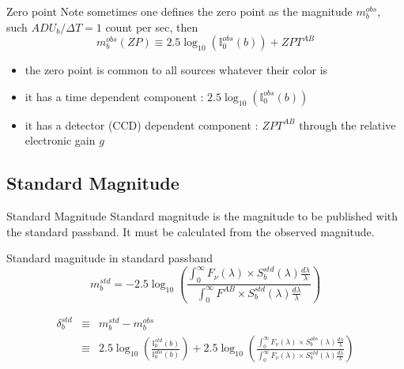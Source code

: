 \documentclass{beamer}
\begin{document}
\begin{frame}{Zero point} 
Note sometimes one defines the zero point as the magnitude $m_b^{obs}$, such $ADU_b/\Delta T = 1$ count per sec, then
\begin{equation}
m^{obs}_b(ZP) \equiv 2.5\log_{10}\left( \mathbb{I}_0^{obs}(b)\right) + ZPT^{AB}
\end{equation}	
\begin{itemize}
\item the zero point is common to all sources whatever their color is 
\item it has a time  dependent component : $2.5\log_{10}\left( \mathbb{I}_0^{obs}(b)\right)$
\item it has a detector (CCD) dependent component :  $ZPT^{AB}$ through the relative electronic gain $g$
\end{itemize}
\end{frame}



\subsection{Standard Magnitude}
\begin{frame}{Standard Magnitude} 
Standard magnitude is the magnitude to be published with the standard passband. 
It must be calculated from the observed magnitude.
\begin{alertblock}{Standard magnitude in standard passband}
	\begin{equation}
	m^{std}_b = -2.5 \log_{10}
	\left( 
	\frac{\int_0^\infty F_\nu(\lambda) \times S_b^{std}(\lambda) \frac{d\lambda}{\lambda} }{\int_0^\infty F^{AB} \times S_b^{std}(\lambda) \frac{d\lambda}{\lambda}} 
	\right)
	\end{equation}	
\end{alertblock}	

\begin{eqnarray}
\delta^{std}_b & \equiv & m_b^{std} - m_b^{obs} \\
& \equiv & 2.5 \log_{10}\left( \frac{\mathbb{I}_0^{std}(b)}{\mathbb{I}_0^{obs}(b)}\right) 
+ 2.5 \log_{10} 
	\left( 
	\frac{\int_0^\infty F_\nu(\lambda) \times S_b^{obs}(\lambda) \frac{d\lambda}{\lambda} }{\int_0^\infty F_\nu(\lambda) \times S_b^{std}(\lambda) \frac{d\lambda}{\lambda}} 
	\right)
\end{eqnarray} 
\end{frame}
\end{document}

